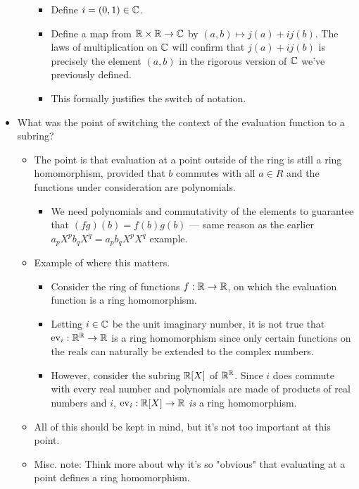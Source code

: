 \documentclass[../notes.tex]{subfiles}
\begin{document}
\begin{itemize}
\begin{itemize}
\begin{itemize}
            \item Define $i=(0,1)\in\mathbb{C}$.
            \item Define a map from $\mathbb{R}\times\mathbb{R}\to\mathbb{C}$ by $(a,b)\mapsto j(a)+ij(b)$. The laws of multiplication on $\mathbb{C}$ will confirm that $j(a)+ij(b)$ is precisely the element $(a,b)$ in the rigorous version of $\mathbb{C}$ we've previously defined.
            \item This formally justifies the switch of notation.
        \end{itemize}
    \end{itemize}
    \item What was the point of switching the context of the evaluation function to a subring?
    \begin{itemize}
        \item The point is that evaluation at a point outside of the ring is still a ring homomorphism, provided that $b$ commutes with all $a\in R$ and the functions under consideration are polynomials.
        \begin{itemize}
            \item We need polynomials and commutativity of the elements to guarantee that $(fg)(b)=f(b)g(b)$ --- same reason as the earlier $a_pX^pb_qX^q=a_pb_qX^pX^q$ example.
        \end{itemize}
        \item Example of where this matters.
        \begin{itemize}
            \item Consider the ring of functions $f:\mathbb{R}\to\mathbb{R}$, on which the evaluation function is a ring homomorphism.
            \item Letting $i\in\mathbb{C}$ be the unit imaginary number, it is not true that $\operatorname{ev}_i:\mathbb{R}^{\mathbb{R}}\to\mathbb{R}$ is a ring homomorphism since only certain functions on the reals can naturally be extended to the complex numbers.
            \item However, consider the subring $\mathbb{R}[X]$ of $\mathbb{R}^{\mathbb{R}}$. Since $i$ does commute with every real number and polynomials are made of products of real numbers and $i$, $\operatorname{ev}_i:\mathbb{R}[X]\to\mathbb{R}$ \emph{is} a ring homomorphism.
        \end{itemize}
        \item All of this should be kept in mind, but it's not too important at this point. 
        \item Misc. note: Think more about why it's so "obvious" that evaluating at a point defines a ring homomorphism.
        \begin{itemize}

\end{itemize}
\end{itemize}
\end{itemize}
\end{document}

